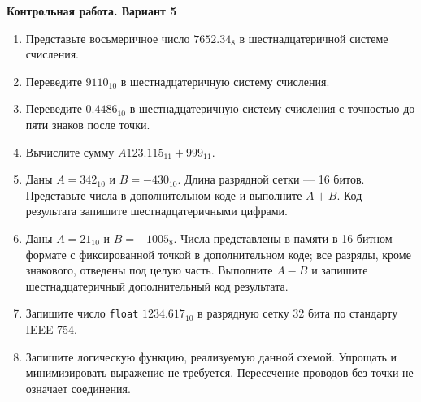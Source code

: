 \documentclass[a4paper,14pt]{extreport}
\begin{document}
\begin{center}\textbf{Контрольная работа. Вариант 5}\end{center}
\begin{enumerate}
    \item Представьте восьмеричное число $7652.34_8$ в шестнадцатеричной системе счисления.
    \item Переведите $9110_{10}$ в шестнадцатеричную систему счисления.
    \item Переведите $0.4486_{10}$ в шестнадцатеричную систему счисления с точностью до пяти знаков после точки.
    \item Вычислите сумму $A123.115_{11}+999_{11}$.
    \item Даны $A=342_{10}$ и $B=-430_{10}$. Длина разрядной сетки --- 16 битов. Представьте числа в дополнительном коде и выполните $A+B$. Код результата запишите шестнадцатеричными цифрами.
    \item Даны $A=21_{10}$ и $B=-1005_8$. Числа представлены в памяти в 16-битном формате с фиксированной точкой в дополнительном коде; все разряды, кроме знакового, отведены под целую часть. Выполните $A-B$ и запишите шестнадцатеричный дополнительный код результата.
    \item Запишите число \texttt{float} $1234.617_{10}$ в разрядную сетку 32 бита по стандарту IEEE 754.
    \item Запишите логическую функцию, реализуемую данной схемой. Упрощать и минимизировать выражение не требуется. Пересечение проводов без точки не означает соединения.
    \krCommonScheme
\end{enumerate}
\end{document}
